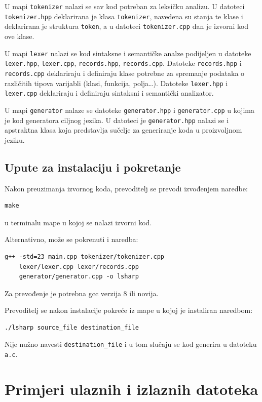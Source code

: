 \documentclass[times, utf8, zavrsni]{fer}
\begin{document}
U mapi \verb|tokenizer| nalazi se sav kod potreban za leksičku analizu. U datoteci \linebreak \verb|tokenizer.hpp| deklarirana je
klasa \verb|tokenizer|, navedena su stanja te klase i deklarirana je struktura \verb|token|, a u datoteci \verb|tokenizer.cpp|
dan je izvorni kod ove klase.

U mapi \verb|lexer| nalazi se kod sintaksne i semantičke analze podijeljen u datoteke \verb|lexer.hpp|, \verb|lexer.cpp|, \verb|records.hpp|, \verb|records.cpp|.
Datoteke \linebreak \verb|records.hpp| i \verb|records.cpp| deklariraju i definiraju klase potrebne za spremanje podataka o različitih tipova varijabli (klasi, funkcija, polja\dots).
Datoteke \verb|lexer.hpp| i \verb|lexer.cpp| deklariraju i definiraju sintaksni i semantički analizator.

U mapi \verb|generator| nalaze se datoteke \verb|generator.hpp| i \verb|generator.cpp| u kojima je kod generatora ciljnog jezika.
U datoteci je \verb|generator.hpp| nalazi se i apstraktna klasa koja predstavlja sučelje za generiranje koda u proizvoljnom jeziku.

\section{Upute za instalaciju i pokretanje}
Nakon preuzimanja izvornog koda, prevoditelj se prevodi izvođenjem naredbe:
\begin{verbatim}
make
\end{verbatim}
u terminalu mape u kojoj se nalazi izvorni kod. 

Alternativno, može se pokrenuti i naredba:
\begin{verbatim}
g++ -std=23 main.cpp tokenizer/tokenizer.cpp 
    lexer/lexer.cpp lexer/records.cpp 
    generator/generator.cpp -o lsharp
\end{verbatim}

Za prevođenje je potrebna gcc verzija 8 ili novija.

Prevoditelj se nakon instalacije pokreće iz mape u kojoj je instaliran naredbom:
\begin{verbatim}
./lsharp source_file destination_file
\end{verbatim}
Nije nužno navesti \verb|destination_file| i u tom slučaju se kod generira u datoteku \verb|a.c|.

\chapter{Primjeri ulaznih i izlaznih datoteka} %
\end{document}
